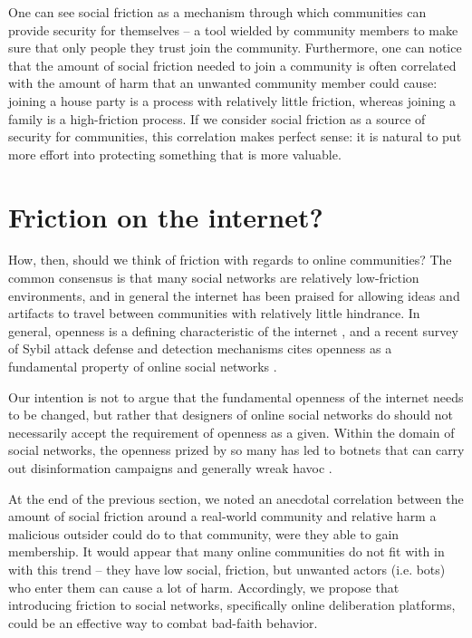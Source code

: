 \documentclass[sigconf,authordraft]{acmart}
\begin{document}
One can see social friction as a mechanism through which communities can provide security for themselves -- a tool wielded by community members to make sure that only people they trust join the community. Furthermore, one can notice that the amount of social friction needed to join a community is often correlated with the amount of harm that an unwanted community member could cause: joining a house party is a process with relatively little friction, whereas joining a family is a high-friction process. If we consider social friction as a source of security for communities, this correlation makes perfect sense: it is natural to put more effort into protecting something that is more valuable.

\section{Friction on the internet?}

How, then, should we think of friction with regards to online communities? The common consensus is that many social networks are relatively low-friction environments, and in general the internet has been praised for allowing ideas and artifacts to travel between communities with relatively little hindrance. In general, openness is a defining characteristic of the internet \cite{bechmann2014ubiquitous, lessig2002future}, and a recent survey of Sybil attack defense and detection mechanisms cites openness as a fundamental property of online social networks \cite{al2017sybil}.

Our intention is not to argue that the fundamental openness of the internet needs to be changed, but rather that designers of online social networks do should not necessarily accept the requirement of openness as a given. Within the domain of social networks, the openness prized by so many has led to botnets that can carry out disinformation campaigns and generally wreak havoc \cite{boshmaf2013design, kramer2014experimental, wu2013detecting, messias2013you, benkler2018network, bessi2016social}. 

At the end of the previous section, we noted an anecdotal correlation between the amount of social friction around a real-world community and relative harm a malicious outsider could do to that community, were they able to gain membership. It would appear that many online communities do not fit with in with this trend -- they have low social, friction, but unwanted actors (i.e. bots) who enter them can cause a lot of harm. Accordingly, we propose that introducing friction to social networks, specifically online deliberation platforms, could be an effective way to combat bad-faith behavior.
\end{document}
